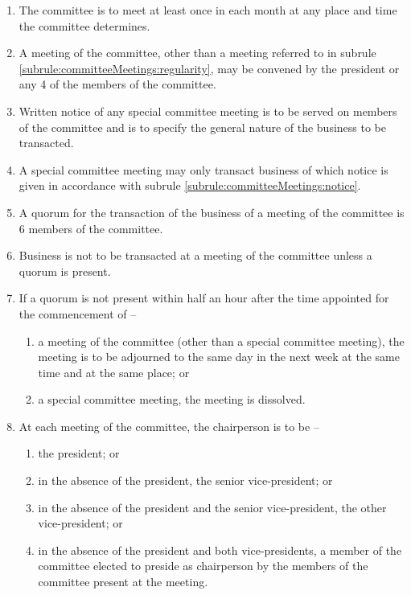 \documentclass[a4paper,11pt]{article}
\begin{document}
\begin{enumerate}
	\item \label{subrule:committeeMeetings:regularity} The committee is to meet at least once in each month at any place and time the committee determines.
	\item A meeting of the committee, other than a meeting referred to in subrule \ref{subrule:committeeMeetings:regularity}, may be convened by the president or any 4 of the members of the committee.
	\item \label{subrule:committeeMeetings:notice} Written notice of any special committee meeting is to be served on members of the committee and is to specify the general nature of the business to be transacted.
	\item A special committee meeting may only transact business of which notice is given in accordance with subrule \ref{subrule:committeeMeetings:notice}.
	\item A quorum for the transaction of the business of a meeting of the committee is 6 members of the committee.
	\item Business is not to be transacted at a meeting of the committee unless a quorum is present.
	
	\item If a quorum is not present within half an hour after the time appointed for the commencement of --
	\begin{enumerate}
		\item a meeting of the committee (other than a special committee meeting), the meeting is to be adjourned to the same day in the next week at the same time and at the same place; or
		\item a special committee meeting, the meeting is dissolved.
	\end{enumerate}
	
	\item At each meeting of the committee, the chairperson is to be --
	\begin{enumerate}
		\item the president; or
		\item in the absence of the president, the senior vice-president; or
		\item in the absence of the president and the senior vice-president, the other vice-president; or
		\item in the absence of the president and both vice-presidents, a member of the committee elected to preside as chairperson by the members of the committee present at the meeting.
	\end{enumerate}
	

\end{enumerate}
\end{document}

